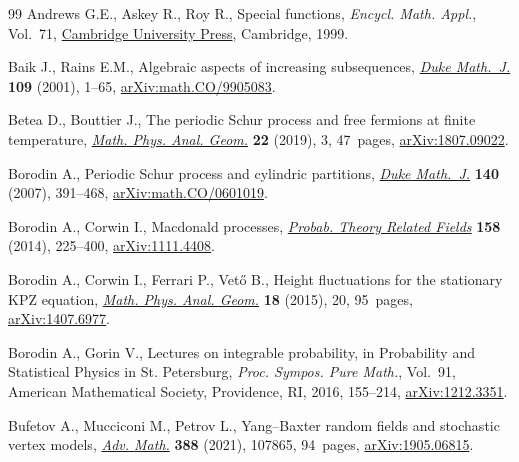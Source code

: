 \documentclass[11pt]{article}
\numberwithin{equation}{section}
\numberwithin{equation}{section}
\begin{document}
\begin{thebibliography}{99}
Andrews G.E., Askey R., Roy R., Special functions, \textit{Encycl. Math.
 Appl.}, Vol.~71, \href{https://doi.org/10.1017/CBO9781107325937}{Cambridge University Press}, Cambridge, 1999.

Baik J., Rains E.M., Algebraic aspects of increasing subsequences, \href{https://doi.org/10.1215/S0012-7094-01-10911-3}{\textit{Duke
 Math.~J.}} \textbf{109} (2001), 1--65, \href{https://arxiv.org/abs/math.CO/9905083}{arXiv:math.CO/9905083}.

Betea D., Bouttier J., The periodic {S}chur process and free fermions at finite
 temperature, \href{https://doi.org/10.1007/s11040-018-9299-8}{\textit{Math. Phys. Anal. Geom.}} \textbf{22} (2019), 3,
 47~pages, \href{https://arxiv.org/abs/1807.09022}{arXiv:1807.09022}.

Borodin A., Periodic {S}chur process and cylindric partitions, \href{https://doi.org/10.1215/S0012-7094-07-14031-6}{\textit{Duke
 Math.~J.}} \textbf{140} (2007), 391--468, \href{https://arxiv.org/abs/math.CO/0601019}{arXiv:math.CO/0601019}.

Borodin A., Corwin I., Macdonald processes, \href{https://doi.org/10.1007/s00440-013-0482-3}{\textit{Probab. Theory Related
 Fields}} \textbf{158} (2014), 225--400, \href{https://arxiv.org/abs/1111.4408}{arXiv:1111.4408}.

Borodin A., Corwin I., Ferrari P., Vet\H{o} B., Height fluctuations for the
 stationary {KPZ} equation, \href{https://doi.org/10.1007/s11040-015-9189-2}{\textit{Math. Phys. Anal. Geom.}} \textbf{18}
 (2015), 20, 95~pages, \href{https://arxiv.org/abs/1407.6977}{arXiv:1407.6977}.

Borodin A., Gorin V., Lectures on integrable probability, in Probability and
 {S}tatistical {P}hysics in {S}t. {P}etersburg, \textit{Proc. Sympos. Pure
 Math.}, Vol.~91, American Mathematical Society, Providence, RI, 2016,
 155--214, \href{https://arxiv.org/abs/1212.3351}{arXiv:1212.3351}.

Bufetov A., Mucciconi M., Petrov L., Yang--{B}axter random fields and
 stochastic vertex models, \href{https://doi.org/10.1016/j.aim.2021.107865}{\textit{Adv. Math.}} \textbf{388} (2021), 107865,
 94~pages, \href{https://arxiv.org/abs/1905.06815}{arXiv:1905.06815}.


\end{thebibliography}
\end{document}

